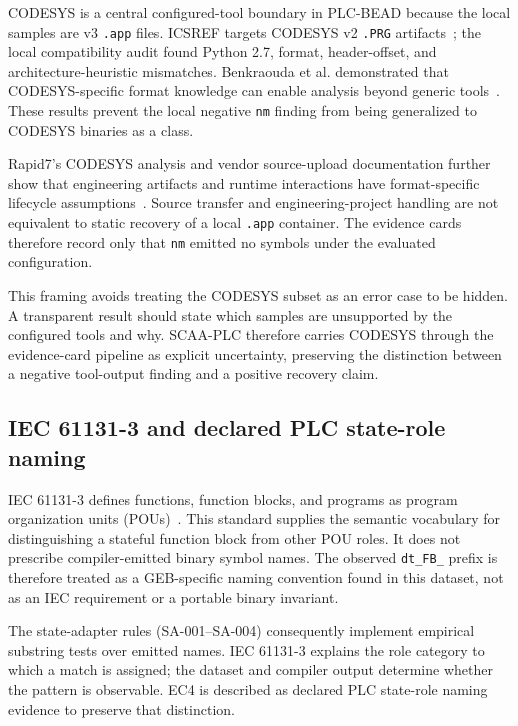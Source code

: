 \documentclass[manuscript,screen,review]{acmart}
\begin{document}
CODESYS is a central configured-tool boundary in PLC-BEAD because the local samples are v3 \texttt{.app} files. ICSREF targets CODESYS v2 \texttt{.PRG} artifacts~\cite{icsref_ndss2019}; the local compatibility audit found Python 2.7, format, header-offset, and architecture-heuristic mismatches. Benkraouda et al. demonstrated that CODESYS-specific format knowledge can enable analysis beyond generic tools~\cite{benkraouda_codesys2023}. These results prevent the local negative \texttt{nm} finding from being generalized to CODESYS binaries as a class.

Rapid7's CODESYS analysis and vendor source-upload documentation further show that engineering artifacts and runtime interactions have format-specific lifecycle assumptions~\cite{rapid7_codesys_whitepaper2023,codesys_source_upload_docs}. Source transfer and engineering-project handling are not equivalent to static recovery of a local \texttt{.app} container. The evidence cards therefore record only that \texttt{nm} emitted no symbols under the evaluated configuration.

This framing avoids treating the CODESYS subset as an error case to be hidden. A transparent result should state which samples are unsupported by the configured tools and why. SCAA-PLC therefore carries CODESYS through the evidence-card pipeline as explicit uncertainty, preserving the distinction between a negative tool-output finding and a positive recovery claim.

\subsection{IEC 61131-3 and declared PLC state-role naming}

IEC 61131-3 defines functions, function blocks, and programs as program organization units (POUs)~\cite{iec61131_3}. This standard supplies the semantic vocabulary for distinguishing a stateful function block from other POU roles. It does not prescribe compiler-emitted binary symbol names. The observed \texttt{dt\_FB\_} prefix is therefore treated as a GEB-specific naming convention found in this dataset, not as an IEC requirement or a portable binary invariant.

The state-adapter rules (SA-001--SA-004) consequently implement empirical substring tests over emitted names. IEC 61131-3 explains the role category to which a match is assigned; the dataset and compiler output determine whether the pattern is observable. EC4 is described as declared PLC state-role naming evidence to preserve that distinction.
\end{document}
